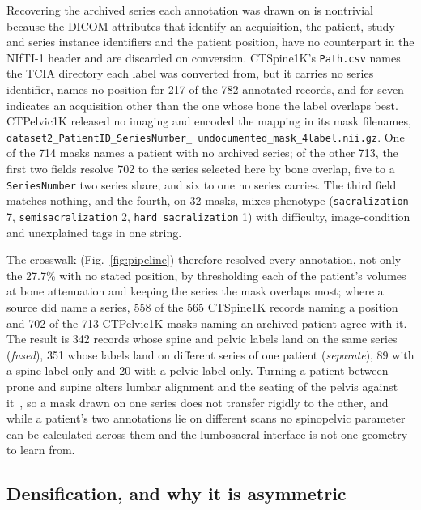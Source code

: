 \documentclass[aapm,mph,amsmath,amssymb,reprint]{revtex4-2}
\begin{document}
Recovering the archived series each annotation was drawn on is nontrivial because the DICOM
attributes that identify an acquisition, the patient, study and series instance identifiers
and the patient position,\cite{dicomps3} have no counterpart in the NIfTI-1
header\cite{nifti1} and are discarded on conversion.\cite{li2016} CTSpine1K's
\texttt{Path.csv} names the TCIA directory each label was converted from, but it carries no
series identifier, names no position for 217 of the 782 annotated records, and for seven
indicates an acquisition other than the one whose bone the label overlaps best.
CTPelvic1K released no imaging and encoded the mapping in its mask filenames,
\texttt{dataset2\_\allowbreak PatientID\_\allowbreak SeriesNumber\_\allowbreak
undocumented\_\allowbreak [tag\_]\allowbreak mask\_4label.nii.gz}. One of the 714 masks names a
patient with no archived series; of the other 713, the first two fields resolve 702 to the
series selected here by bone overlap, five to a \texttt{SeriesNumber} two series share, and six
to one no series carries. The third field matches nothing, and the fourth, on 32 masks, mixes
phenotype (\texttt{sacralization} 7, \texttt{semisacralization} 2,
\texttt{hard\_sacralization} 1) with difficulty, image-condition and unexplained tags in one
string.

The crosswalk (Fig.~\ref{fig:pipeline}) therefore resolved every annotation, not only the
27.7\% with no stated position, by thresholding each of the patient's volumes at bone
attenuation and keeping the series the mask overlaps most; where a source did name a series,
558 of the 565 CTSpine1K records naming a position and 702 of the 713 CTPelvic1K masks naming
an archived patient agree with it. The result is 342 records whose spine and pelvic labels
land on the same series (\emph{fused}), 351 whose labels land on different series of one
patient (\emph{separate}), 89 with a spine label only and 20 with a pelvic label only. Turning
a patient between prone and supine alters lumbar alignment and the seating of the pelvis
against it~\cite{hasegawa2018}, so a mask drawn on one series does not transfer rigidly to the
other, and while a patient's two annotations lie on different scans no spinopelvic parameter
can be calculated across them and the lumbosacral interface is not one geometry to learn from.

\subsection{Densification, and why it is asymmetric}
\end{document}
